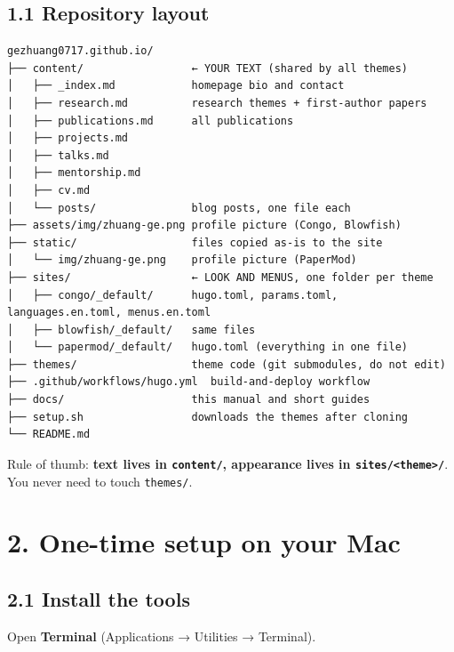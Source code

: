 \documentclass[
  10pt,
]{article}
\begin{document}
\hypertarget{repository-layout}{%
\subsection{1.1 Repository layout}\label{repository-layout}}

\begin{verbatim}
gezhuang0717.github.io/
├── content/                 ← YOUR TEXT (shared by all themes)
│   ├── _index.md            homepage bio and contact
│   ├── research.md          research themes + first-author papers
│   ├── publications.md      all publications
│   ├── projects.md
│   ├── talks.md
│   ├── mentorship.md
│   ├── cv.md
│   └── posts/               blog posts, one file each
├── assets/img/zhuang-ge.png profile picture (Congo, Blowfish)
├── static/                  files copied as-is to the site
│   └── img/zhuang-ge.png    profile picture (PaperMod)
├── sites/                   ← LOOK AND MENUS, one folder per theme
│   ├── congo/_default/      hugo.toml, params.toml, languages.en.toml, menus.en.toml
│   ├── blowfish/_default/   same files
│   └── papermod/_default/   hugo.toml (everything in one file)
├── themes/                  theme code (git submodules, do not edit)
├── .github/workflows/hugo.yml  build-and-deploy workflow
├── docs/                    this manual and short guides
├── setup.sh                 downloads the themes after cloning
└── README.md
\end{verbatim}

Rule of thumb: \textbf{text lives in \texttt{content/}, appearance lives
in \texttt{sites/\textless{}theme\textgreater{}/}}. You never need to
touch \texttt{themes/}.

\hypertarget{one-time-setup-on-your-mac}{%
\section{2. One-time setup on your
Mac}\label{one-time-setup-on-your-mac}}

\hypertarget{install-the-tools}{%
\subsection{2.1 Install the tools}\label{install-the-tools}}

Open \textbf{Terminal} (Applications → Utilities → Terminal).
\end{document}
